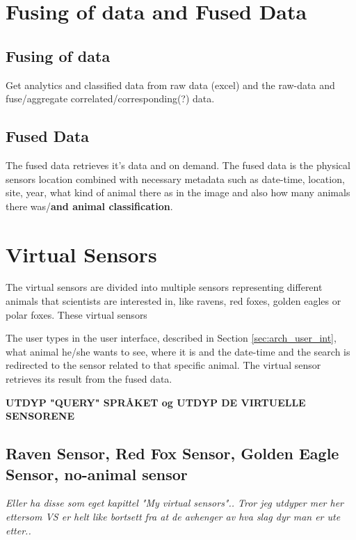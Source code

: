 \documentclass[USenglish]{uit-thesis}
\begin{document}



\section{Fusing of data and Fused Data}
\subsection{Fusing of data}
Get analytics and classified data from raw data (excel) and the raw-data and fuse/aggregate correlated/corresponding(?) data.


\subsection{Fused Data}
The fused data retrieves it's data and on demand. The fused data is the physical sensors location combined with necessary metadata such as date-time, location, site, year, what kind of animal there as in the image and also how many animals there was/\textbf{and animal classification}.


\section{Virtual Sensors} \label{sec:arch_vs}
The virtual sensors are divided into multiple sensors representing different animals that scientists are interested in, like ravens, red foxes, golden eagles or polar foxes.
These virtual sensors 

The user types in the user interface, described in Section \ref{sec:arch_user_int}, what animal he/she wants to see, where it is and the date-time and the search is redirected to the sensor related to that specific animal. The virtual sensor retrieves its result from the fused data.

\textbf{UTDYP "QUERY" SPRÅKET og UTDYP DE VIRTUELLE SENSORENE}

\subsection{Raven Sensor, Red Fox Sensor, Golden Eagle Sensor, no-animal sensor}
\textit{Eller ha disse som eget kapittel "My virtual sensors".. Tror jeg utdyper mer her ettersom VS er helt like bortsett fra at de avhenger av hva slag dyr man er ute etter..}
\end{document}
